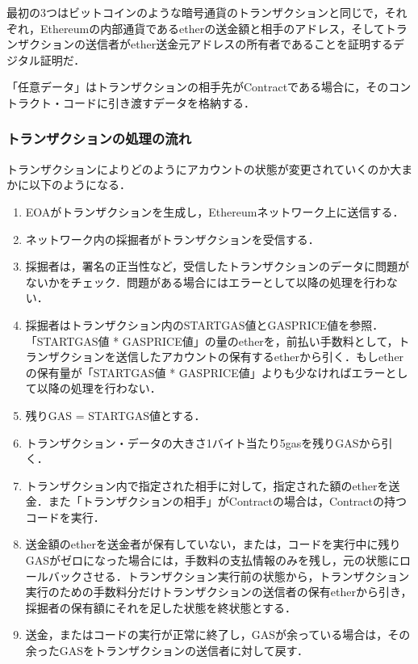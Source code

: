 最初の3つはビットコインのような暗号通貨のトランザクションと同じで，それぞれ，Ethereumの内部通貨であるetherの送金額と相手のアドレス，そしてトランザクションの送信者がether送金元アドレスの所有者であることを証明するデジタル証明だ．

「任意データ」はトランザクションの相手先がContractである場合に，そのコントラクト・コードに引き渡すデータを格納する．

\newpage

\subsubsection*{トランザクションの処理の流れ}
トランザクションによりどのようにアカウントの状態が変更されていくのか大まかに以下のようになる．
\begin{enumerate}
\item EOAがトランザクションを生成し，Ethereumネットワーク上に送信する．

\item ネットワーク内の採掘者がトランザクションを受信する．

\item 採掘者は，署名の正当性など，受信したトランザクションのデータに問題がないかをチェック．問題がある場合にはエラーとして以降の処理を行わない．

\item 採掘者はトランザクション内のSTARTGAS値とGASPRICE値を参照．「STARTGAS値 * GASPRICE値」の量のetherを，前払い手数料として，トランザクションを送信したアカウントの保有するetherから引く．もしetherの保有量が「STARTGAS値 * GASPRICE値」よりも少なければエラーとして以降の処理を行わない．

\item 残りGAS = STARTGAS値とする．

\item トランザクション・データの大きさ1バイト当たり5gasを残りGASから引く．

\item トランザクション内で指定された相手に対して，指定された額のetherを送金．また「トランザクションの相手」がContractの場合は，Contractの持つコードを実行．

\item 送金額のetherを送金者が保有していない，または，コードを実行中に残りGASがゼロになった場合には，手数料の支払情報のみを残し，元の状態にロールバックさせる．トランザクション実行前の状態から，トランザクション実行のための手数料分だけトランザクションの送信者の保有etherから引き，採掘者の保有額にそれを足した状態を終状態とする．

\item 送金，またはコードの実行が正常に終了し，GASが余っている場合は，その余ったGASをトランザクションの送信者に対して戻す．
\end{enumerate}

